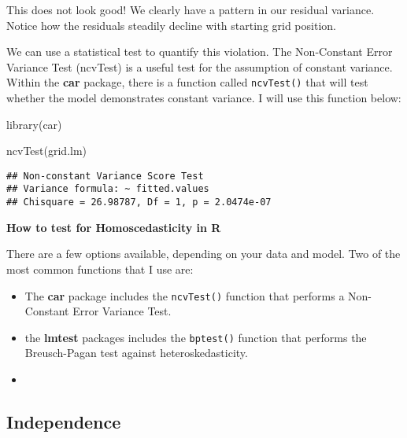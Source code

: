 \documentclass[
]{book}
\newenvironment{Shaded}{\begin{snugshade}}{\end{snugshade}}
\newcommand{\FunctionTok}[1]{\textcolor[rgb]{0.00,0.00,0.00}{#1}}
\newcommand{\NormalTok}[1]{#1}
\providecommand{\tightlist}{%
  \setlength{\itemsep}{0pt}\setlength{\parskip}{0pt}}
\begin{document}
This does not look good! We clearly have a pattern in our residual variance. Notice how the residuals steadily decline with starting grid position.

We can use a statistical test to quantify this violation. The Non-Constant Error Variance Test (ncvTest) is a useful test for the assumption of constant variance. Within the \textbf{car} package, there is a function called \texttt{ncvTest()} that will test whether the model demonstrates constant variance. I will use this function below:

\begin{Shaded}
\begin{Highlighting}[]
\FunctionTok{library}\NormalTok{(car)}

\FunctionTok{ncvTest}\NormalTok{(grid.lm)}
\end{Highlighting}
\end{Shaded}

\begin{verbatim}
## Non-constant Variance Score Test 
## Variance formula: ~ fitted.values 
## Chisquare = 26.98787, Df = 1, p = 2.0474e-07
\end{verbatim}

\begin{blackbox}

\begin{center}
\textbf{How to test for Homoscedasticity in R}

\end{center}

There are a few options available, depending on your data and model. Two of the most common functions that I use are:

\begin{itemize}
\tightlist
\item
  The \textbf{car} package includes the \texttt{ncvTest()} function that performs a Non-Constant Error Variance Test.
\item
  the \textbf{lmtest} packages includes the \texttt{bptest()} function that performs the Breusch-Pagan test against heteroskedasticity.
\item
\end{itemize}

\end{blackbox}

\hypertarget{independence}{%
\subsection{Independence}\label{independence}}
\end{document}
